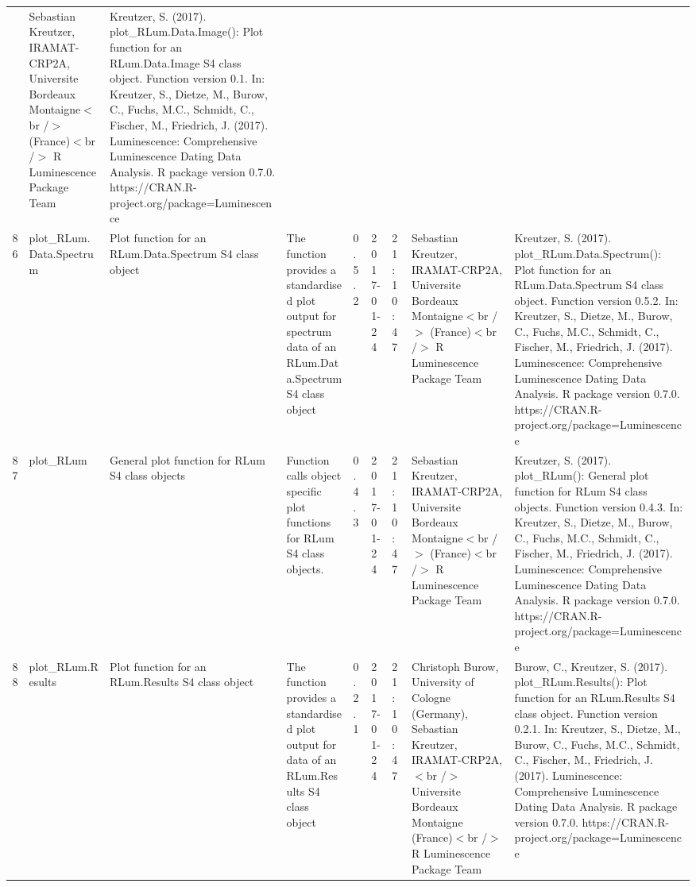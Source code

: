 \begin{table}[ht]
\begin{tabular}{rllllllll}
 & Sebastian Kreutzer, IRAMAT-CRP2A, Universite Bordeaux Montaigne$<$br /$>$ (France)$<$br /$>$  R Luminescence Package Team & Kreutzer, S. (2017). plot\_RLum.Data.Image(): Plot function for an RLum.Data.Image S4 class object. Function version 0.1. In: Kreutzer, S., Dietze, M., Burow, C., Fuchs, M.C., Schmidt, C., Fischer, M., Friedrich, J. (2017). Luminescence: Comprehensive Luminescence Dating Data Analysis. R package version 0.7.0. https://CRAN.R-project.org/package=Luminescence
 \\ 
  86 & plot\_RLum.Data.Spectrum & Plot function for an RLum.Data.Spectrum S4 class object & The function provides a standardised plot output for spectrum data of an RLum.Data.Spectrum S4 class object & 0.5.2 & 2017-01-24 & 21:10:47
 & Sebastian Kreutzer, IRAMAT-CRP2A, Universite Bordeaux Montaigne$<$br /$>$ (France)$<$br /$>$  R Luminescence Package Team & Kreutzer, S. (2017). plot\_RLum.Data.Spectrum(): Plot function for an RLum.Data.Spectrum S4 class object. Function version 0.5.2. In: Kreutzer, S., Dietze, M., Burow, C., Fuchs, M.C., Schmidt, C., Fischer, M., Friedrich, J. (2017). Luminescence: Comprehensive Luminescence Dating Data Analysis. R package version 0.7.0. https://CRAN.R-project.org/package=Luminescence
 \\ 
  87 & plot\_RLum & General plot function for RLum S4 class objects & Function calls object specific plot functions for RLum S4 class objects. & 0.4.3 & 2017-01-24 & 21:10:47
 & Sebastian Kreutzer, IRAMAT-CRP2A, Universite Bordeaux Montaigne$<$br /$>$ (France)$<$br /$>$  R Luminescence Package Team & Kreutzer, S. (2017). plot\_RLum(): General plot function for RLum S4 class objects. Function version 0.4.3. In: Kreutzer, S., Dietze, M., Burow, C., Fuchs, M.C., Schmidt, C., Fischer, M., Friedrich, J. (2017). Luminescence: Comprehensive Luminescence Dating Data Analysis. R package version 0.7.0. https://CRAN.R-project.org/package=Luminescence
 \\ 
  88 & plot\_RLum.Results & Plot function for an RLum.Results S4 class object & The function provides a standardised plot output for data of an RLum.Results S4 class object & 0.2.1 & 2017-01-24 & 21:10:47
 & Christoph Burow, University of Cologne (Germany), Sebastian Kreutzer, IRAMAT-CRP2A,$<$br /$>$ Universite Bordeaux Montaigne (France)$<$br /$>$  R Luminescence Package Team & Burow, C., Kreutzer, S. (2017). plot\_RLum.Results(): Plot function for an RLum.Results S4 class object. Function version 0.2.1. In: Kreutzer, S., Dietze, M., Burow, C., Fuchs, M.C., Schmidt, C., Fischer, M., Friedrich, J. (2017). Luminescence: Comprehensive Luminescence Dating Data Analysis. R package version 0.7.0. https://CRAN.R-project.org/package=Luminescence

\end{tabular}
\end{table}
